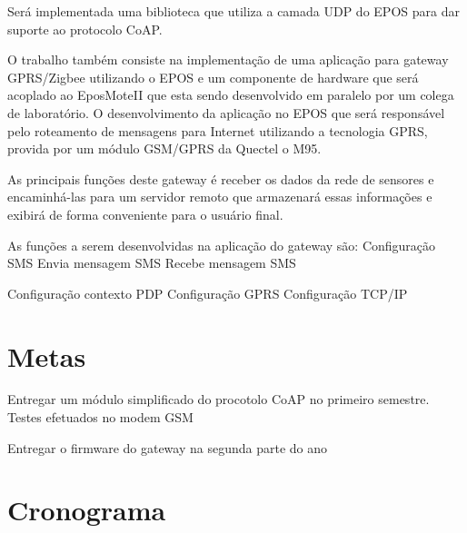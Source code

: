 Ser\'a implementada uma biblioteca que utiliza a camada UDP do EPOS para dar suporte ao protocolo CoAP.

O trabalho tamb\'em consiste na implementa\c{c}\~ao de uma aplica\c{c}\~ao para gateway GPRS/Zigbee utilizando o EPOS e um componente de hardware que ser\'a acoplado ao EposMoteII que esta sendo desenvolvido em paralelo por um colega de laborat\'orio. O desenvolvimento da aplica\c{c}\~ao no EPOS que ser\'a respons\'avel pelo roteamento de mensagens para Internet utilizando a tecnologia GPRS, provida por um m\'odulo GSM/GPRS da Quectel o M95.

As principais fun\c{c}\~oes deste gateway \'e receber os dados da rede de sensores e encaminh\'a-las para um servidor remoto que armazenar\'a essas informa\c{c}\~oes e exibir\'a de forma conveniente para o usu\'ario final.

As fun\c{c}\~oes a serem desenvolvidas na aplica\c{c}\~ao do gateway s\~ao:
Configura\c{c}\~ao SMS
Envia mensagem SMS
Recebe mensagem SMS

Configura\c{c}\~ao contexto PDP
Configura\c{c}\~ao GPRS
Configura\c{c}\~ao TCP/IP

\section{Metas}
Entregar um m\'odulo simplificado do procotolo CoAP no primeiro semestre.
Testes efetuados no modem GSM

Entregar o firmware do gateway na segunda parte do ano

\section{Cronograma}

